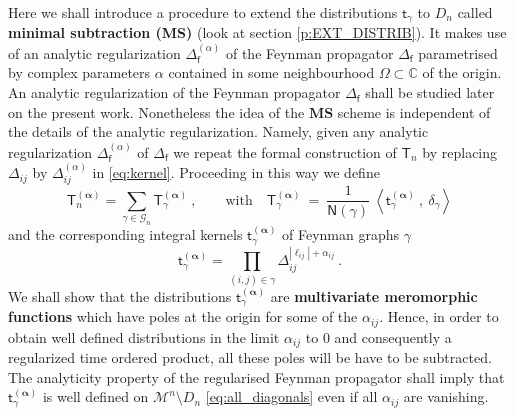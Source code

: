 \documentclass[12pt]{book}
\newcommand{\MS}{\textbf{MS}}
\newcommand{\abs}[1]{\left|#1\right|}
\newcommand{\sm}[1]{\left\langle#1\right\rangle}
\newcommand{\Gcal}{\mathcal{G}}
\newcommand{\Mcal}{\mathcal{M}}
\newcommand{\Cbb}{\mathbb{C}}
\newcommand{\Nsf}{\mathsf{N}}
\newcommand{\Tsf}{\mathsf{T}}
\newcommand{\fsf}{\mathsf{f}}
\newcommand{\tsf}{\mathsf{t}}
\theoremstyle{break}
\begin{document}
Here we shall introduce a procedure to extend the distributions $\tsf_\gamma$ to $D_n$ called \textbf{minimal subtraction (MS)} (look at section \ref{p:EXT_DISTRIB}). It makes use of an analytic regularization $\Delta_\fsf^{(\alpha)}$ of the Feynman propagator $\Delta_\fsf$ parametrised by complex parameters $\alpha$ contained in some neighbourhood $\Omega \subset \Cbb$ of the origin. An analytic regularization of the Feynman propagator $\Delta_\fsf$ shall be studied later on the present work. Nonetheless the idea of the $\MS$ scheme is independent of the details of the analytic regularization. Namely, given any analytic regularization $\Delta^{(\alpha)}_\fsf$ of $\Delta_\fsf$ we repeat the formal construction of $\Tsf_n$ by replacing $\Delta_{ij}$ by $\Delta^{(\alpha)}_{ij}$ in \eqref{eq:kernel}. Proceeding in this way we define 
%
\begin{equation}
\Tsf_n^{(\boldsymbol{\alpha})} = \sum_{\gamma \in \Gcal_n} \Tsf_\gamma^{(\boldsymbol{\alpha})} \ , \qquad \mbox{with} \quad \Tsf_\gamma^{(\boldsymbol{\alpha})} \ = \ \frac{1}{\Nsf(\gamma)} \ \sm{\tsf_\gamma^{(\boldsymbol{\alpha})} \ , \ \delta_\gamma}
\label{eq:time_ordered_prod_graph_reg}
\end{equation}
%
and the corresponding integral kernels $\tsf^{(\boldsymbol{\alpha})}_\gamma$ of Feynman graphs $\gamma$ 
%
\begin{equation}
\tsf^{(\boldsymbol{\alpha})}_\gamma = \prod_{(i,j) \in \gamma} \Delta_{ij}^{\abs{\ell_{ij}}+\alpha_{ij}} \ .
\label{eq:kernel_reg}
\end{equation}
%
We shall show that the distributions $\tsf^{(\boldsymbol{\alpha})}_\gamma$ are \textbf{multivariate meromorphic functions} which have poles at the origin for some of the $\alpha_{ij}$. Hence, in order to obtain well defined distributions in the limit $\alpha_{ij}$ to $0$ and consequently a regularized time ordered product, all these poles will be have to be subtracted. The analyticity property of the regularised Feynman propagator shall imply that $\tsf^{(\boldsymbol{\alpha})}_\gamma$ is well defined on $ \Mcal^n \setminus D_n $ \eqref{eq:all_diagonals} even if all $\alpha_{ij}$ are vanishing. 
\end{document}
